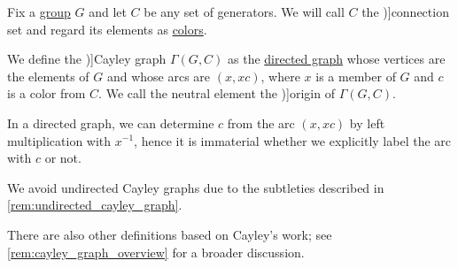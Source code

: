 \begin{definition}\label{def:cayley_graph}\mimprovised
  Fix a \hyperref[def:group]{group} \( G \) and let \( C \) be any set of generators. We will call \( C \) the \term[en=connection set (\cite[def. 7.3.1]{Knauer2019AlgebraicGraphTheory})]{connection set} and regard its elements as \hyperref[def:set_coloring]{colors}.

  We define the \term[en=Cayley graph (\cite[def. 2.1.3]{HadelerMüller2017CellularAutomata})]{Cayley graph} \( \Gamma(G, C) \) as the \hyperref[def:directed_graph]{directed graph} whose vertices are the elements of \( G \) and whose arcs are \( (x, xc) \), where \( x \) is a member of \( G \) and \( c \) is a color from \( C \). We call the neutral element the \term[en=origin (\cite[def. 2.1.3]{HadelerMüller2017CellularAutomata})]{origin} of \( \Gamma(G, C) \).
\end{definition}
\begin{comments}
  \item In a directed graph, we can determine \( c \) from the arc \( (x, xc) \) by left multiplication with \( x^{-1} \), hence it is immaterial whether we explicitly label the arc with \( c \) or not.

  \item We avoid undirected Cayley graphs due to the subtleties described in \cref{rem:undirected_cayley_graph}.

  \item There are also other definitions based on Cayley's work; see \cref{rem:cayley_graph_overview} for a broader discussion.
\end{comments}

